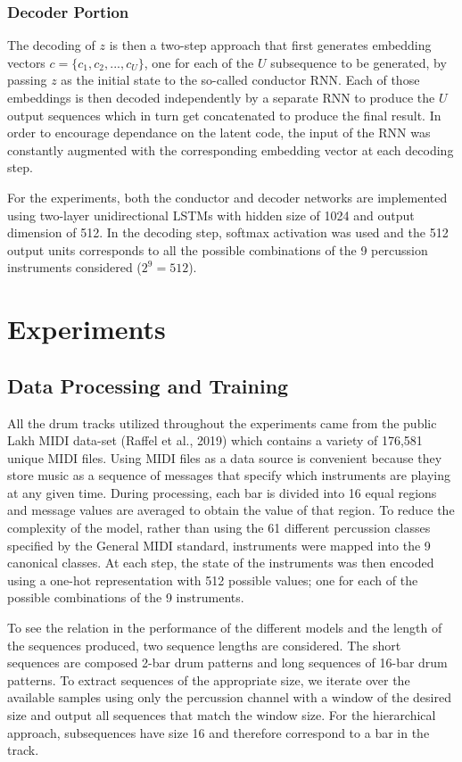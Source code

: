 \documentclass[10pt,twocolumn]{article}
\begin{document}
\subsubsection{Decoder Portion}
The decoding of $z$ is then a two-step approach that first generates embedding vectors $c = \{ c_1, c_2, ..., c_U \}$, one for each of the $U$ subsequence to be generated, by passing $z$ as the initial state to the so-called conductor RNN. Each of those embeddings is then decoded independently by a separate RNN to produce the $U$ output sequences which in turn get concatenated to produce the final result. In order to encourage dependance on the latent code, the input of the RNN was constantly augmented with the corresponding embedding vector at each decoding step.

For the experiments, both the conductor and decoder networks are implemented using two-layer unidirectional LSTMs with hidden size of 1024 and output dimension of 512. In the decoding step, softmax activation was used and the 512 output units corresponds to all the possible combinations of the 9 percussion instruments considered ($2^9 = 512$).

\section{Experiments}

\subsection{Data Processing and Training}
All the drum tracks utilized throughout the experiments came from the public Lakh MIDI data-set (Raffel et al., 2019)\cite{raffel2016extracting} which contains a variety of 176,581 unique MIDI files. Using MIDI files as a data source is convenient because they store music as a sequence of messages that specify which instruments are playing at any given time. During processing, each bar is divided into 16 equal regions and message values are averaged to obtain the value of that region. To reduce the complexity of the model, rather than using the 61 different percussion classes specified by the General MIDI standard, instruments were mapped into the 9 canonical classes. At each step, the state of the instruments was then encoded using a one-hot representation with 512 possible values; one for each of the possible combinations of the 9 instruments.

To see the relation in the performance of the different models and the length of the sequences produced, two sequence lengths are considered. The short sequences are composed 2-bar drum patterns and long sequences of 16-bar drum patterns. To extract sequences of the appropriate size, we iterate over the available samples using only the percussion channel with a window of the desired size and output all sequences that match the window size. For the hierarchical approach, subsequences have size 16 and therefore correspond to a bar in the track.
\end{document}
